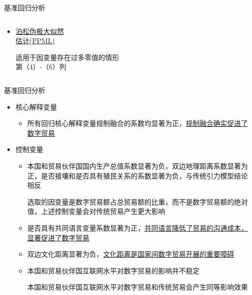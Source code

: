 \documentclass{beamer}
\begin{document}
\begin{frame}{基准回归分析}
\begin{columns}[T]
\begin{column}{0.3\textwidth}
\begin{itemize}
\begin{scriptsize}
                    最基本的回归方法，在经验分析中经常被采用 \\
                    第（1）-（3）列
                \end{scriptsize}
                \item \uline{
                    泊松伪极大似然 \\
                    估计(PPML)
                    } \\
                \begin{scriptsize}
                    适用于因变量存在过多零值的情形 \\
                    第（4）-（6）列
                \end{scriptsize}
            \end{itemize}
        \end{column}
    \end{columns}
\end{frame}

\begin{frame}{基准回归分析}
    \begin{itemize}
        \item 核心解释变量
        \begin{itemize}
            \item 所有回归核心解释变量规制融合的系数均显著为正，\uline{规制融合确实促进了数字贸易}
        \end{itemize}
        \item 控制变量
        \begin{itemize}
            \item 本国和贸易伙伴国国内生产总值系数显著为负，双边地理距离系数显著为正，是否接壤和是否具有殖民关系的系数显著为负，与传统引力模型结论相反 \\
            \begin{scriptsize}
                选取的因变量是数字贸易额占总贸易额的比重，而不是数字贸易额的绝对值，上述控制变量会对传统贸易产生更大影响
            \end{scriptsize}
            \item 是否具有共同语言变量系数显著为正，\uline{共同语言降低了贸易的沟通成本，显著促进了数字贸易}
            \item 双边文化距离显著为负，\uline{文化距离是国家间数字贸易开展的重要障碍}
            \item 本国和贸易伙伴国互联网水平对数字贸易的影响并不稳定 \\
            \begin{scriptsize}
                本国和贸易伙伴国互联网水平对数字贸易和传统贸易会产生同等影响效果
            \end{scriptsize}
        \end{itemize}
    \end{itemize}
\end{frame}
\end{document}
